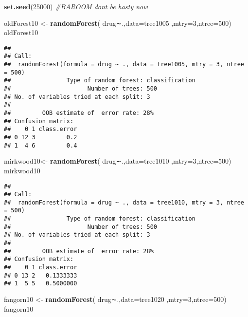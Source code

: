 \documentclass[]{article}
\newenvironment{Shaded}{\begin{snugshade}}{\end{snugshade}}
\newcommand{\KeywordTok}[1]{\textcolor[rgb]{0.13,0.29,0.53}{\textbf{#1}}}
\newcommand{\DataTypeTok}[1]{\textcolor[rgb]{0.13,0.29,0.53}{#1}}
\newcommand{\DecValTok}[1]{\textcolor[rgb]{0.00,0.00,0.81}{#1}}
\newcommand{\StringTok}[1]{\textcolor[rgb]{0.31,0.60,0.02}{#1}}
\newcommand{\CommentTok}[1]{\textcolor[rgb]{0.56,0.35,0.01}{\textit{#1}}}
\newcommand{\NormalTok}[1]{#1}
\begin{document}
\begin{Shaded}
\begin{Highlighting}[]
\KeywordTok{set.seed}\NormalTok{(}\DecValTok{25000}\NormalTok{)}
\CommentTok{#BAROOM dont be hasty now}

\NormalTok{oldForest10 <-}\StringTok{ }\KeywordTok{randomForest}\NormalTok{( drug∼.,}\DataTypeTok{data=}\NormalTok{tree1005  ,}\DataTypeTok{mtry=}\DecValTok{3}\NormalTok{,}\DataTypeTok{ntree=}\DecValTok{500}\NormalTok{)}
\NormalTok{oldForest10}
\end{Highlighting}
\end{Shaded}

\begin{verbatim}
## 
## Call:
##  randomForest(formula = drug ~ ., data = tree1005, mtry = 3, ntree = 500) 
##                Type of random forest: classification
##                      Number of trees: 500
## No. of variables tried at each split: 3
## 
##         OOB estimate of  error rate: 28%
## Confusion matrix:
##    0 1 class.error
## 0 12 3         0.2
## 1  4 6         0.4
\end{verbatim}

\begin{Shaded}
\begin{Highlighting}[]
\NormalTok{mirkwood10<-}\StringTok{ }\KeywordTok{randomForest}\NormalTok{( drug∼.,}\DataTypeTok{data=}\NormalTok{tree1010  ,}\DataTypeTok{mtry=}\DecValTok{3}\NormalTok{,}\DataTypeTok{ntree=}\DecValTok{500}\NormalTok{)}
\NormalTok{mirkwood10}
\end{Highlighting}
\end{Shaded}

\begin{verbatim}
## 
## Call:
##  randomForest(formula = drug ~ ., data = tree1010, mtry = 3, ntree = 500) 
##                Type of random forest: classification
##                      Number of trees: 500
## No. of variables tried at each split: 3
## 
##         OOB estimate of  error rate: 28%
## Confusion matrix:
##    0 1 class.error
## 0 13 2   0.1333333
## 1  5 5   0.5000000
\end{verbatim}

\begin{Shaded}
\begin{Highlighting}[]
\NormalTok{fangorn10 <-}\StringTok{ }\KeywordTok{randomForest}\NormalTok{( drug∼.,}\DataTypeTok{data=}\NormalTok{tree1020  ,}\DataTypeTok{mtry=}\DecValTok{3}\NormalTok{,}\DataTypeTok{ntree=}\DecValTok{500}\NormalTok{)}
\NormalTok{fangorn10}
\end{Highlighting}
\end{Shaded}
\end{document}
